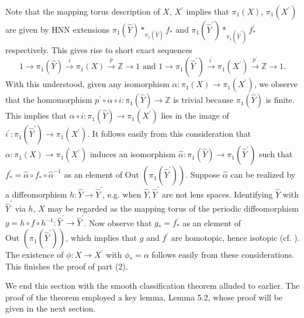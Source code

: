 \documentclass[11pt]{amsart}
\theoremstyle{plain}
\numberwithin{theorem}{section}
\theoremstyle{definition}
\begin{document}
Note that the mapping torus description of $X$, $X^\prime$ implies that $\pi_1(X)$, 
$\pi_1(X^\prime)$ are given by HNN extensions $\pi_1(\hat{Y})\ast_{\pi_1(\hat{Y})} f_\ast$
and $\pi_1(\hat{Y}^\prime)\ast_{\pi_1(\hat{Y}^\prime)} f^\prime_\ast$ respectively. This gives 
rise to short exact sequences 
$$
1\rightarrow\pi_1(\hat{Y})\stackrel{i}{\rightarrow}\pi_1(X) \stackrel{p}{\rightarrow} {{\mathbb Z}}\rightarrow 1
\mbox{ and }
1\rightarrow\pi_1(\hat{Y}^\prime)\stackrel{i^\prime}{\rightarrow}\pi_1(X^\prime) \stackrel{p^\prime}{\rightarrow} {{\mathbb Z}}\rightarrow 1.
$$
With this understood, given any isomorphism $\alpha: \pi_1(X)\rightarrow \pi_1(X^\prime)$,
we observe that the homomorphism $p^\prime\circ \alpha\circ i: \pi_1(\hat{Y})\rightarrow {{\mathbb Z}}$ 
is trivial because $\pi_1(\hat{Y})$ is finite. This implies that $\alpha\circ i: \pi_1(\hat{Y})\rightarrow 
\pi_1(X^\prime)$ lies in the image of $i^\prime: \pi_1(\hat{Y}^\prime)\rightarrow \pi_1(X^\prime)$.
It follows easily from this consideration that $\alpha: \pi_1(X)\rightarrow \pi_1(X^\prime)$ induces 
an isomorphism $\hat{\alpha}: \pi_1(\hat{Y})\rightarrow \pi_1(\hat{Y}^\prime)$ such that 
$f^\prime_\ast= \hat{\alpha}\circ f_\ast\circ \hat{\alpha}^{-1}$ as an element of 
$\text{Out }(\pi_1(\hat{Y}^\prime))$. Suppose $\hat{\alpha}$ 
can be realized by a diffeomorphism $h: \hat{Y}\rightarrow \hat{Y}^\prime$, e.g. 
when $\hat{Y}, \hat{Y}^\prime$ are not lens spaces. Identifying $\hat{Y}$ with
$\hat{Y}^\prime$ via $h$, $X$ may be regarded as the mapping torus of the periodic 
diffeomorphism $g=h\circ f\circ h^{-1}: \hat{Y}^\prime\rightarrow \hat{Y}^\prime$. 
Now observe that $g_\ast=f^\prime_\ast$ as an element of $\text{Out }(\pi_1(\hat{Y}^\prime))$, 
which implies that $g$ and $f^\prime$ are homotopic, hence isotopic 
(cf. \cite{A, Rub, B, HR, BR, BO}). 
The existence of $\phi:X\rightarrow X^\prime$ with $\phi_\ast=\alpha$ follows easily from these considerations. This finishes the proof of part (2). 

We end this section with the smooth classification theorem alluded to earlier. The proof of the theorem employed a key lemma, Lemma 5.2, whose proof will be given in the next section. 
\end{document}
